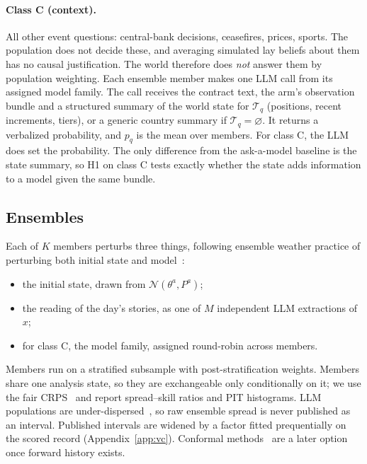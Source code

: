 \documentclass[11pt]{article}
\begin{document}
\paragraph{Class C (context).} All other event questions: central-bank decisions, ceasefires, prices, sports. The population does not decide these, and averaging simulated lay beliefs about them has no causal justification. The world therefore does \emph{not} answer them by population weighting. Each ensemble member makes one LLM call from its assigned model family. The call receives the contract text, the arm's observation bundle and a structured summary of the world state for $\mathcal{T}_q$ (positions, recent increments, tiers), or a generic country summary if $\mathcal{T}_q=\varnothing$. It returns a verbalized probability, and $p_q$ is the mean over members. For class C, the LLM does set the probability. The only difference from the ask-a-model baseline is the state summary, so H1 on class C tests exactly whether the state adds information to a model given the same bundle.

\subsection{Ensembles}\label{sec:ensembles}
Each of $K$ members perturbs three things, following ensemble weather practice of perturbing both initial state and model~\citep{leutbecher2008ensemble}:
\begin{itemize}
  \item the initial state, drawn from $\mathcal{N}(\theta^a,P^a)$;
  \item the reading of the day's stories, as one of $M$ independent LLM extractions of $x$;
  \item for class C, the model family, assigned round-robin across members.
\end{itemize}
Members run on a stratified subsample with post-stratification weights. Members share one analysis state, so they are exchangeable only conditionally on it; we use the fair CRPS~\citep{ferro2014fair} and report spread--skill ratios and PIT histograms. LLM populations are under-dispersed~\citep{bisbee2024synthetic,wang2024misportray}, so raw ensemble spread is never published as an interval. Published intervals are widened by a factor fitted prequentially on the scored record (Appendix~\ref{app:vc}). Conformal methods~\citep{angelopoulos2023conformal} are a later option once forward history exists.
\end{document}
